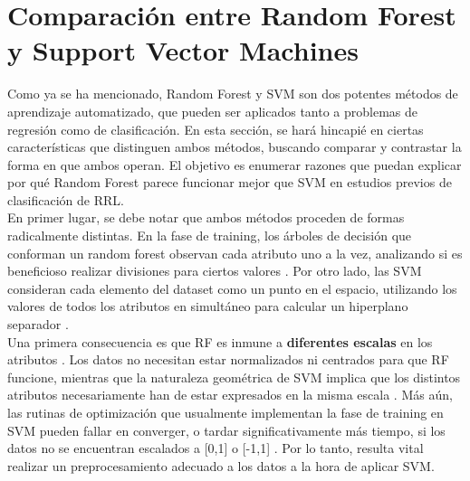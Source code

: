 \section{ Comparación entre Random Forest y Support Vector Machines}

Como ya se ha mencionado, Random Forest y SVM son dos potentes métodos de aprendizaje automatizado, que pueden ser aplicados tanto a problemas de regresión como de clasificación. En esta sección, se hará hincapié en ciertas características que distinguen ambos métodos, buscando comparar y contrastar la forma en que ambos operan. El objetivo es enumerar razones que puedan explicar por qué Random Forest parece funcionar mejor que SVM en estudios previos de clasificación de RRL.\\

En primer lugar, se debe notar que ambos métodos proceden de formas radicalmente distintas. En la fase de training, los árboles de decisión que conforman un random forest observan cada atributo uno a la vez, analizando si es beneficioso realizar divisiones para ciertos valores \cite{mitchell}. Por otro lado, las SVM consideran cada elemento del dataset como un punto en el espacio, utilizando los valores de todos los atributos en simultáneo para calcular un hiperplano separador \cite{svm2}. \\

Una primera consecuencia es que RF es inmune a \textbf{diferentes escalas} en los atributos \cite{statisticallearning}. Los datos no necesitan estar normalizados ni centrados para que RF funcione, mientras que la naturaleza geométrica de SVM implica que los distintos atributos necesariamente han de estar expresados en la misma escala \cite{svm_practical}. Más aún, las rutinas de optimización que usualmente implementan la fase de training en SVM pueden fallar en converger, o tardar significativamente más tiempo, si los datos no se encuentran escalados a [0,1] o [-1,1]
\cite{svm_practical}. Por lo tanto, resulta vital realizar un preprocesamiento adecuado a los datos a la hora de aplicar SVM. \\ 

